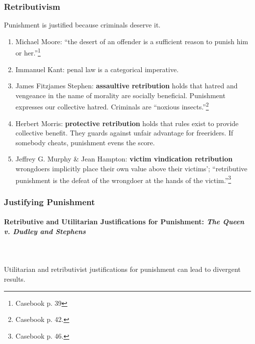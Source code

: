 \subsubsection{Retributivism}

Punishment is justified because criminals deserve it.

\begin{enumerate}
    \item Michael Moore: ``the desert of an offender is a sufficient reason to 
    punish him or her.''\footnote{Casebook p. 39}
    \item Immanuel Kant: penal law is a categorical imperative.
    \item James Fitzjames Stephen: \textbf{assaultive retribution} holds that 
    hatred and vengeance in the name of morality are socially beneficial. 
    Punishment expresses our collective hatred. Criminals are ``noxious 
    insects.''\footnote{Casebook p. 42.}
    \item Herbert Morris: \textbf{protective retribution} holds that rules 
    exist to provide collective benefit. They guards against unfair advantage 
    for freeriders. If somebody cheats, punishment evens the score.
    \item Jeffrey G. Murphy \& Jean Hampton: \textbf{victim vindication 
    retribution} wrongdoers implicitly place their own value above their 
    victims'; ``retributive punishment is the defeat of the wrongdoer at the 
    hands of the victim.''\footnote{Casebook p. 46.}
\end{enumerate}

\subsubsection{Justifying Punishment}

\paragraph{Retributive and Utilitarian Justifications for Punishment: 
\emph{The Queen v. Dudley and Stephens}}
~\\\\
Utilitarian and retributivist justifications for punishment can lead to 
divergent results.

